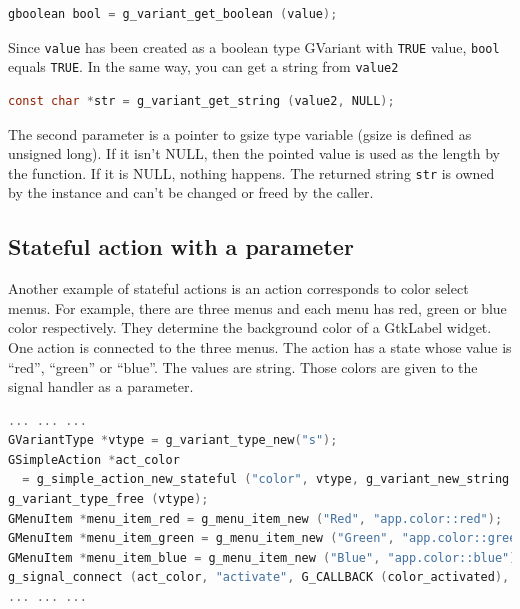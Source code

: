 \begin{lstlisting}[language=C]
gboolean bool = g_variant_get_boolean (value);
\end{lstlisting}

Since \passthrough{\lstinline!value!} has been created as a boolean type
GVariant with \passthrough{\lstinline!TRUE!} value,
\passthrough{\lstinline!bool!} equals \passthrough{\lstinline!TRUE!}. In
the same way, you can get a string from \passthrough{\lstinline!value2!}

\begin{lstlisting}[language=C]
const char *str = g_variant_get_string (value2, NULL);
\end{lstlisting}

The second parameter is a pointer to gsize type variable (gsize is
defined as unsigned long). If it isn't NULL, then the pointed value is
used as the length by the function. If it is NULL, nothing happens. The
returned string \passthrough{\lstinline!str!} is owned by the instance
and can't be changed or freed by the caller.

\subsection{Stateful action with a
parameter}\label{stateful-action-with-a-parameter}

Another example of stateful actions is an action corresponds to color
select menus. For example, there are three menus and each menu has red,
green or blue color respectively. They determine the background color of
a GtkLabel widget. One action is connected to the three menus. The
action has a state whose value is ``red'', ``green'' or ``blue''. The
values are string. Those colors are given to the signal handler as a
parameter.

\begin{lstlisting}[language=C]
... ... ...
GVariantType *vtype = g_variant_type_new("s");
GSimpleAction *act_color
  = g_simple_action_new_stateful ("color", vtype, g_variant_new_string ("red"));
g_variant_type_free (vtype);
GMenuItem *menu_item_red = g_menu_item_new ("Red", "app.color::red");
GMenuItem *menu_item_green = g_menu_item_new ("Green", "app.color::green");
GMenuItem *menu_item_blue = g_menu_item_new ("Blue", "app.color::blue");
g_signal_connect (act_color, "activate", G_CALLBACK (color_activated), NULL);
... ... ...
\end{lstlisting}

